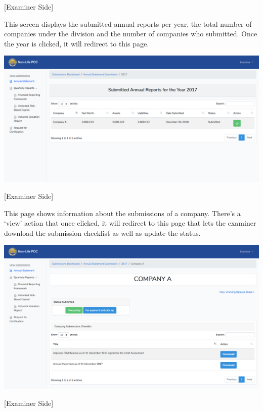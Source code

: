 \documentclass{article}
\begin{document}
[Examiner Side]%

This screen displays the submitted annual reports per
year, the total number of companies under the division and the number of
companies who submitted. Once the year is clicked, it will redirect to
this page.%

\includegraphics[keepaspectratio=true]{up-ic-screens/image163}{}%

[Examiner Side]%

This page shows information about the submissions of a
company. There’s a ‘view’ action that once clicked, it will redirect to
this page that lets the examiner download the submission checklist as
well as update the status.%

\includegraphics[keepaspectratio=true]{up-ic-screens/image25}{}%

[Examiner Side]%
\end{document}
